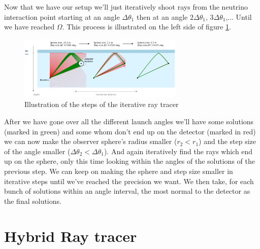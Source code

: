 \documentclass[11pt,a4paper,faculty=we,language=en,doctype=report]{cls/ugent-doc}
\begin{document}
Now that we have our setup we'll just iteratively shoot rays from the neutrino
interaction point starting at an angle $\Delta \theta_1$ then at an angle
$2\Delta \theta_1$, $3\Delta \theta_1$,... Until we have reached $\Omega$. This
process is illustrated on the left side of figure \ref{fig:IterativeWorkings}.
\begin{figure}
  \centering
  \includegraphics[width=0.7\textwidth]{IterativeWorkings.png}
  \caption{Illustration of the steps of the iterative ray tracer}
  \label{fig:IterativeWorkings}
\end{figure}
After we have gone over all the different launch angles we'll have some
solutions (marked in green) and some whom don't end up on the detector (marked
in red) we can now make the observer sphere's radius smaller ($r_2 < r_1$) and
the step size of the angle smaller ($\Delta \theta_2 < \Delta \theta_1$).  And
again iteratively find the rays which end up on the sphere, only this time
looking within the angles of the solutions of the previous step. We can keep on
making the sphere and step size smaller in iterative steps until we've reached
the precision we want. We then take, for each bunch of solutions within an
angle interval, the most normal to the detector as the final solutions.


\chapter{Hybrid Ray tracer}
\label{chapter:hybrid}
\end{document}

